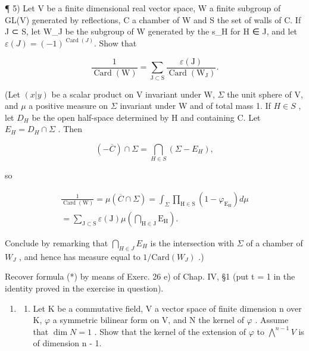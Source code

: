 ¶ 5) Let V be a finite dimensional real vector space, W a finite subgroup of GL(V) generated by reflections, C a chamber of W and S the set of walls of C. If J ⊂ S, let W\_J be the subgroup of W generated by the s\_H for H ∈ J, and let \(\varepsilon(J) = (-1)^{\operatorname{Card}(J)}\). Show that

\[
\frac {1}{\operatorname{Card} (\mathrm{W})} = \sum_ {\mathrm{J} \subset \mathrm{S}} \frac {\varepsilon (\mathrm{J})}{\operatorname{Card} (\mathrm{W} _ {\mathrm{J}})}.\tag{(*)}
\]

(Let \((x|y)\) be a scalar product on V invariant under W, \(\Sigma\) the unit sphere of V, and \(\mu\) a positive measure on \(\Sigma\) invariant under W and of total mass 1. If \(H \in S\) , let \(D_{H}\) be the open half-space determined by H and containing C. Let \(E_{H} = D_{H} \cap \Sigma\) . Then

\[
(- \overline {{C}}) \cap \Sigma = \bigcap_ {H \in S} (\Sigma - E _ {H}),
\]

so

\[
\begin{array}{l} \frac {1}{\operatorname{Card} (\mathrm{W})} = \mu (\overline {{C}} \cap \Sigma) = \int_ {\Sigma} \prod_ {\mathrm{H} \in \mathrm{S}} (1 - \varphi_ {\mathrm{E} _ {\mathrm{H}}}) d \mu \\ = \sum_ {\mathrm{J} \subset \mathrm{S}} \varepsilon (\mathrm{J}) \mu \left(\bigcap_ {\mathrm{H} \in \mathrm{J}} \mathrm{E} _ {\mathrm{H}}\right). \end{array}
\]

Conclude by remarking that \(\bigcap_{H\in J}E_H\) is the intersection with \(\Sigma\) of a chamber of \(W_J\) , and hence has measure equal to \(1 / \mathrm{Card}(W_J)\) .)

Recover formula (*) by means of Exerc. 26 e) of Chap. IV, §1 (put t = 1 in the identity proved in the exercise in question).

\begin{enumerate}
\def\labelenumi{\arabic{enumi})}
\setcounter{enumi}{5}
\tightlist
\item
  \begin{enumerate}
  \def\labelenumii{\alph{enumii})}
  \tightlist
  \item
    Let K be a commutative field, V a vector space of finite dimension n over K, \(\varphi\) a symmetric bilinear form on V, and N the kernel of \(\varphi\) . Assume that \(\dim N = 1\) . Show that the kernel of the extension of \(\varphi\) to \(\bigwedge^{n-1} V\) is of dimension n - 1.
  \end{enumerate}
\end{enumerate}

